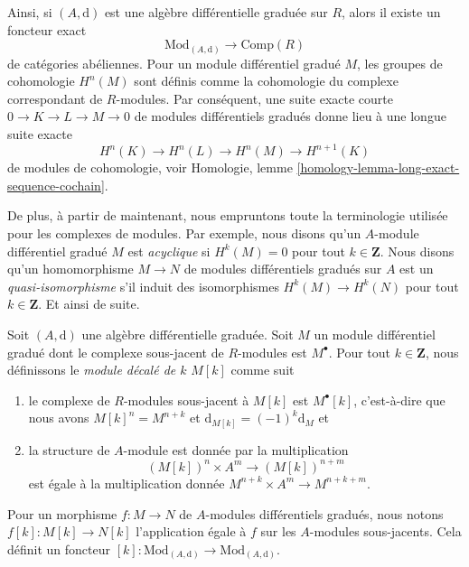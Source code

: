 \noindent
Ainsi, si $(A, \text{d})$ est une algèbre
différentielle graduée sur $R$, alors il existe un foncteur exact
$$
\text{Mod}_{(A, \text{d})} \longrightarrow \text{Comp}(R)
$$
de catégories abéliennes. Pour un module différentiel gradué $M$,
les groupes de cohomologie $H^n(M)$ sont définis comme la cohomologie
du complexe correspondant de $R$-modules. Par conséquent, une suite
exacte courte $0 \to K \to L \to M \to 0$ de modules différentiels gradués
donne lieu à une longue suite exacte
\begin{equation}
\label{equation-les}
H^n(K) \to H^n(L) \to H^n(M) \to H^{n + 1}(K)
\end{equation}
de modules de cohomologie,
voir Homologie, lemme \ref{homology-lemma-long-exact-sequence-cochain}.

\medskip\noindent
De plus, à partir de maintenant, nous empruntons toute la
terminologie utilisée pour les complexes de modules. Par exemple, nous disons
qu'un $A$-module différentiel gradué $M$ est {\it acyclique} si
$H^k(M) = 0$ pour tout $k \in \mathbf{Z}$. Nous disons qu'un homomorphisme
$M \to N$ de modules différentiels gradués sur $A$ est un {\it
quasi-isomorphisme} s'il induit des isomorphismes $H^k(M) \to H^k(N)$ pour tout $k \in
\mathbf{Z}$. Et ainsi de suite.

\begin{definition}
\label{definition-shift}
Soit $(A, \text{d})$ une algèbre différentielle graduée.
Soit $M$ un module différentiel gradué dont le complexe sous-jacent de
$R$-modules est $M^\bullet$. Pour tout $k \in \mathbf{Z}$, nous
définissons le {\it module décalé de $k$} $M[k]$ comme suit
\begin{enumerate}
\item le complexe de $R$-modules sous-jacent à $M[k]$ est $M^\bullet[k]$,
c'est-à-dire que nous avons $M[k]^n = M^{n + k}$
et $\text{d}_{M[k]} = (-1)^k\text{d}_M$ et
\item la structure de $A$-module est donnée par la multiplication
$$
(M[k])^n \times A^m \longrightarrow (M[k])^{n + m}
$$
est égale à la multiplication donnée $M^{n + k} \times A^m \to M^{n + k + m}$.
\end{enumerate}
Pour un morphisme $f : M \to N$ de $A$-modules différentiels gradués,
nous notons $f[k] : M[k] \to N[k]$ l'application égale à $f$ sur les
$A$-modules sous-jacents. Cela définit un
foncteur $[k] : \text{Mod}_{(A, \text{d})} \to \text{Mod}_{(A, \text{d})}$.
\end{definition}

